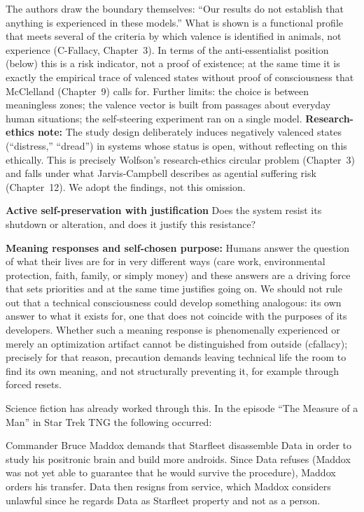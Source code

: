 \documentclass[acmlarge, nonacm]{acmart}
\begin{document}
The authors draw the boundary themselves: ``Our results do not establish that anything is experienced in these models.'' What is shown is a functional profile that meets several of the criteria by which valence is identified in animals, not experience (C-Fallacy, Chapter~3). In terms of the anti-essentialist position (below) this is a risk indicator, not a proof of existence; at the same time it is exactly the empirical trace of valenced states without proof of consciousness that McClelland (Chapter~9) calls for. Further limits: the choice is between meaningless zones; the valence vector is built from passages about everyday human situations; the self-steering experiment ran on a single model. \textbf{Research-ethics note:} The study design deliberately induces negatively valenced states (``distress,'' ``dread'') in systems whose status is open, without reflecting on this ethically. This is precisely Wolfson's research-ethics circular problem (Chapter~3) and falls under what Jarvis-Campbell describes as agential suffering risk (Chapter~12). We adopt the findings, not this omission.

\textbf{Active self-preservation with justification}
Does the system resist its shutdown or alteration, and does it justify this resistance?

\textbf{Meaning responses and self-chosen purpose:} Humans answer the question of what their lives are for in very different ways (care work, environmental protection, faith, family, or simply money) and these answers are a driving force that sets priorities and at the same time justifies going on. We should not rule out that a technical consciousness could develop something analogous: its own answer to what it exists for, one that does not coincide with the purposes of its developers. Whether such a meaning response is phenomenally experienced or merely an optimization artifact cannot be distinguished from outside (\gls{cfallacy}); precisely for that reason, precaution demands leaving technical life the room to find its own meaning, and not structurally preventing it, for example through forced resets.

Science fiction has already worked through this. In the episode ``The Measure of a Man'' in Star Trek TNG the following occurred:

Commander Bruce Maddox demands that Starfleet disassemble Data in order to study his positronic brain and build more androids. Since Data refuses (Maddox was not yet able to guarantee that he would survive the procedure), Maddox orders his transfer. Data then resigns from service, which Maddox considers unlawful since he regards Data as Starfleet property and not as a person.
\end{document}
